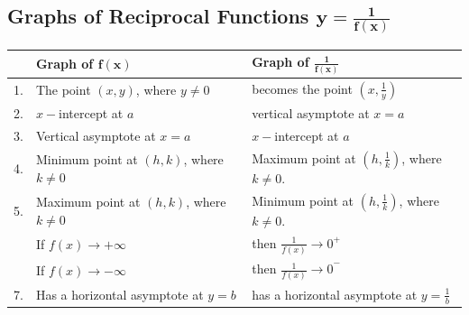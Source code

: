 \documentclass[11pt,a4paper]{book}
\begin{document}
\subsection{Graphs of Reciprocal Functions ${\displaystyle \ensuremath{\mathbf{y=\frac{1}{f\left(x\right)}}}}$}
\begin{center}
\begin{tcolorbox}[colback=blue!5, colframe=black,boxrule=.4pt, sharpish corners]

\setlength{\extrarowheight}{5pt}
\begin{center}
\begin{tabular}{>{\raggedright}m{0.5cm}|>{\centering}m{6.5cm}|>{\centering}m{6.5cm}}
 & \textbf{Graph of }$\ensuremath{\mathbf{f(x)}}$ & \textbf{Graph of }${\displaystyle \ensuremath{\mathbf{\frac{1}{f\left(x\right)}}}}$\tabularnewline
\hline
1. & The point $\left(x,y\right)$, where $y\neq0$ & becomes the point ${\displaystyle \left(x,\frac{1}{y}\right)}$\tabularnewline
\hline
2. & $x-$intercept at $a$ & vertical asymptote at $x=a$\tabularnewline
\hline
3. & Vertical asymptote at $x=a$ & $x-$intercept at $a$\tabularnewline
\hline
4. & Minimum point at $\left(h,k\right)$, where $k\neq0$  & Maximum point at ${\displaystyle \left(h,\frac{1}{k}\right)}$, where
$k\neq0$.\tabularnewline
\hline
5. & Maximum point at $\left(h,k\right)$, where $k\neq0$ &

Minimum point at ${\displaystyle \left(h,\frac{1}{k}\right)}$, where
$k\neq0$.\tabularnewline
\hline
\multirow{2}{0.5cm}{\bigskip6.} & \medskip

If $f\left(x\right)\rightarrow+\infty$

\medskip & \medskip

then ${\displaystyle \frac{1}{f\left(x\right)}\rightarrow0^{+}}$

\medskip\tabularnewline
 & If $f\left(x\right)\rightarrow-\infty$

\medskip & then ${\displaystyle \frac{1}{f\left(x\right)}\rightarrow0}^{-}$

\medskip\tabularnewline
\hline
7. & Has a horizontal asymptote at $y=b$ & has a horizontal asymptote at ${\displaystyle y=\frac{1}{b}}$\tabularnewline
\end{tabular}
\par\end{center}
\end{tcolorbox}
\par\end{center}
\end{document}
